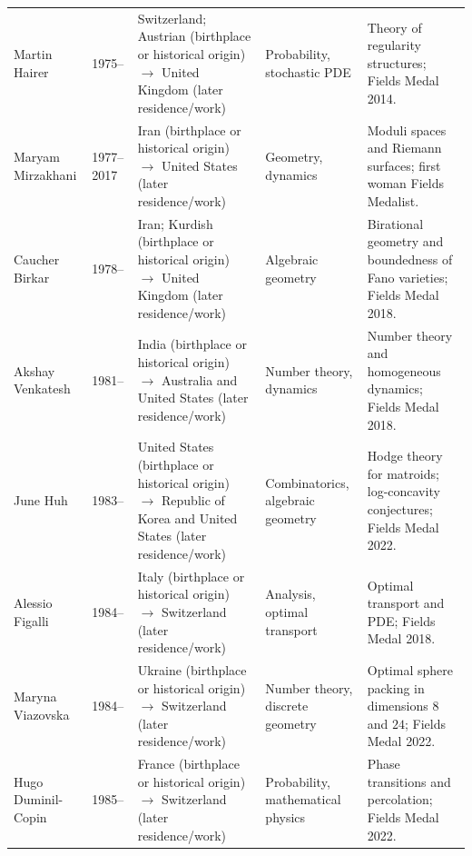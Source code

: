 {\begin{longtable}{@{}L{0.145\textwidth}L{0.09\textwidth}L{0.225\textwidth}L{0.14\textwidth}L{0.30\textwidth}@{}}
        Martin Hairer
        & 1975--
        & Switzerland; Austrian (birthplace or historical origin) \(\to\) United Kingdom (later residence/work)
        & Probability, stochastic PDE
        & Theory of regularity structures; Fields Medal 2014. \\

        Maryam Mirzakhani
        & 1977--2017
        & Iran (birthplace or historical origin) \(\to\) United States (later residence/work)
        & Geometry, dynamics
        & Moduli spaces and Riemann surfaces; first woman Fields Medalist. \\

        Caucher Birkar
        & 1978--
        & Iran; Kurdish (birthplace or historical origin) \(\to\) United Kingdom (later residence/work)
        & Algebraic geometry
        & Birational geometry and boundedness of Fano varieties; Fields Medal
          2018. \\

        Akshay Venkatesh
        & 1981--
        & India (birthplace or historical origin) \(\to\) Australia and United States (later residence/work)
        & Number theory, dynamics
        & Number theory and homogeneous dynamics; Fields Medal 2018. \\

        June Huh
        & 1983--
        & United States (birthplace or historical origin) \(\to\) Republic of Korea and United States (later residence/work)
        & Combinatorics, algebraic geometry
        & Hodge theory for matroids; log-concavity conjectures; Fields Medal
          2022. \\

        Alessio Figalli
        & 1984--
        & Italy (birthplace or historical origin) \(\to\) Switzerland (later residence/work)
        & Analysis, optimal transport
        & Optimal transport and PDE; Fields Medal 2018. \\

        Maryna Viazovska
        & 1984--
        & Ukraine (birthplace or historical origin) \(\to\) Switzerland (later residence/work)
        & Number theory, discrete geometry
        & Optimal sphere packing in dimensions $8$ and $24$; Fields Medal
          2022. \\

        Hugo Duminil-Copin
        & 1985--
        & France (birthplace or historical origin) \(\to\) Switzerland (later residence/work)
        & Probability, mathematical physics
        & Phase transitions and percolation; Fields Medal 2022. \\


\end{longtable}}
